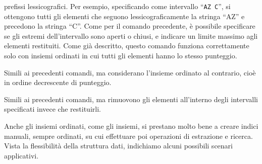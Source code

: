 \begin{description}[style=nextline,font={\bfseries\ttfamily}]
		prefissi lessicografici. Per esempio, specificando come intervallo ``\verb|AZ C|'', si
		ottengono tutti gli elementi che seguono lessicograficamente la stringa ``AZ'' e precedono
		la stringa ``C''. Come per il comando precedente, è possibile specificare se gli estremi
		dell'intervallo sono aperti o chiusi, e indicare un limite massimo agli elementi restituiti.
		Come già descritto, questo comando funziona correttamente solo con insiemi ordinati in cui
		tutti gli elementi hanno lo stesso punteggio.
	\item[ZREVRANGE / ZREVRANGEBYSCORE / ZREVRANGEBYLEX] Simili ai precedenti comandi, ma
		considerano l'insieme ordinato al contrario, cioè in ordine decrescente di punteggio.
	\item[ZREMRANGEBYRANK / ZREMRANGEBYSCORE / ZREMRANGEBYLEX] Simili ai precedenti comandi, ma
		rimuovono gli elementi all'interno degli intervalli specificati invece che restituirli.
\end{description}

Anche gli insiemi ordinati, come gli insiemi, si prestano molto bene a creare indici manuali,
sempre ordinati, su cui effettuare poi operazioni di estrazione e ricerca. Vista la flessibilità
della struttura dati, indichiamo alcuni possibili scenari applicativi.

